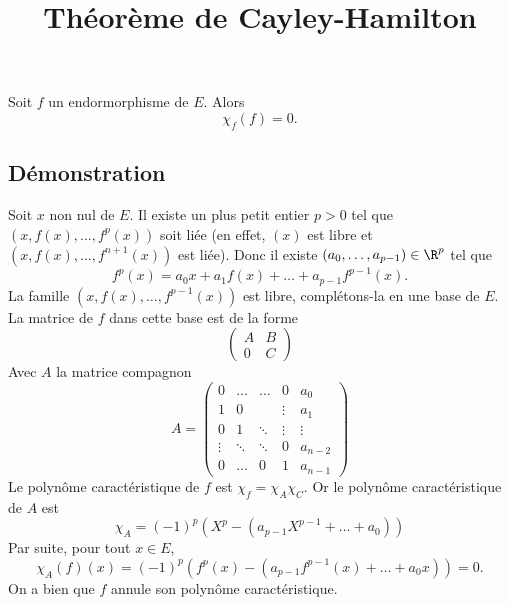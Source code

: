 \documentclass[fontsize=12pt,twoside=false,parskip=half, french]{scrartcl}
\title{Théorème de Cayley-Hamilton}
\date{}
\author{}
\begin{document}
\maketitle
   \begin{Theoreme}
      Soit $f$ un endormorphisme de $E$. Alors
      \[
         \chi_f(f) = 0.
      \]
   \end{Theoreme}
   \subsection{Démonstration}
      Soit $x$ non nul de $E$. Il existe un plus petit entier $p > 0$ tel que $(x, f(x), \ldots, f^p(x))$ soit liée
      (en effet, $(x)$ est libre et $(x, f(x), \ldots, f^{n + 1}(x))$ est liée). Donc il existe 
      $(a_0, \ldots, a_{p - 1}) \in \R^{p}$ tel que
      \[
         f^p(x) = a_0x + a_1 f(x) + \ldots + a_{p - 1}f^{p - 1}(x).
      \]
      La famille $(x, f(x), \ldots, f^{p - 1}(x))$ est libre, complétons-la en une base de $E$. La matrice de $f$ dans cette base est de la forme
      \[
         \begin{pmatrix}
            A & B\\
            0 & C
         \end{pmatrix}
      \]
      Avec $A$ la matrice compagnon
      \[
         A = 
         \begin{pmatrix}
            0      & \ldots & \ldots & 0      & a_0\\
            1      & 0      &        & \vdots & a_1\\
            0      & 1      & \ddots & \vdots & \vdots\\
            \vdots & \ddots & \ddots & 0      & a_{n - 2}\\
            0      & \ldots & 0      & 1      & a_{n - 1}
         \end{pmatrix}
      \]
      Le polynôme caractéristique de $f$ est $\chi_f = \chi_A\chi_C$. Or le polynôme caractéristique de $A$ est
      \[
         \chi_A = (-1)^p(X^p - (a_{p - 1}X^{p - 1} + \ldots + a_0))
      \]
      Par suite, pour tout $x \in E$,
      \[
         \chi_A(f)(x) = (-1)^p(f^p(x) - (a_{p - 1}f^{p - 1}(x) + \ldots + a_0x)) = 0.
      \]
      On a bien que $f$ annule son polynôme caractéristique.
\end{document}
